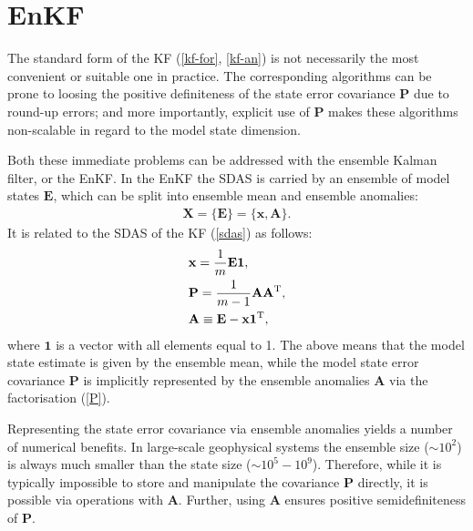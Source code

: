 \documentclass[11pt]{report}
\newcommand{\mb} {\mathbf}
\newcommand{\T}{^{\tiny \mathrm T}}
\begin{document}
\section{EnKF}

The standard form of the KF (\ref{kf-for}, \ref{kf-an}) is not necessarily the most convenient or suitable one in practice.
The corresponding algorithms can be prone to loosing the positive definiteness of the state error covariance $\mb P$ due to round-up errors; and more importantly, explicit use of $\mb P$ makes these algorithms non-scalable in regard to the model state dimension.

Both these immediate problems can be addressed with the ensemble Kalman filter, or the EnKF.
In the EnKF the SDAS is carried by an ensemble of model states $\mb E$, which can be split into ensemble mean and ensemble anomalies:
\begin{align}
  \label{sdas-enkf}
  \mb X = \{\mb E\} = \{\mb x, \mb A\}.
\end{align}
It is related to the SDAS of the KF (\ref{sdas}) as follows:
\begin{subequations}
  \label{E}
  \begin{align}
    \label{x}
    &\mb x = \frac{1}{m} \mb E \mb 1,\\
    \label{P}
    &\mb P = \frac{1}{m - 1} \mb A \mb A\T,\\
    \label{A}
    &\mb A \equiv \mb E - \mb x \mb 1\T,
  \end{align}
\end{subequations}
where $\mb 1$ is a vector with all elements equal to 1.
The above means that the model state estimate is given by the ensemble mean, while the model state error covariance $\mb P$ is implicitly represented by the ensemble anomalies $\mb A$ via the factorisation (\ref{P}).

Representing the state error covariance via ensemble anomalies yields a number of numerical benefits.
In large-scale geophysical systems the ensemble size ($\sim 10^2$) is always much smaller than the state size ($\sim 10^5-10^9$).
Therefore, while it is typically impossible to store and manipulate the covariance $\mb P$ directly, it is possible via operations with $\mb A$.
Further, using $\mb A$ ensures positive semidefiniteness of $\mb P$.
\end{document}
